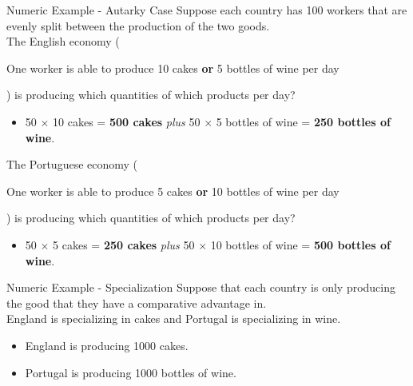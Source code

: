 \documentclass{beamer}
\begin{document}
\begin{frame}{Numeric Example - Autarky Case}
    Suppose each country has 100 workers that are evenly split between the production of the two goods. \vspace{0.1cm} \\
    The English economy (\begin{small}One worker is able to produce 10 cakes \textbf{or} 5 bottles of wine per day\end{small}) is producing which quantities of which products per day? \pause 
    \begin{itemize} \small
        \item 50 $\times$ 10 cakes = \textbf{500 cakes} \textit{plus} 50 $\times$ 5 bottles of wine = \textbf{250 bottles of wine}. \pause
    \end{itemize}
    The Portuguese economy (\begin{small}One worker is able to produce 5 cakes \textbf{or} 10 bottles of wine per day\end{small}) is producing which quantities of which products per day? \pause 
    \begin{itemize} \small
        \item 50 $\times$ 5 cakes = \textbf{250 cakes} \textit{plus} 50 $\times$ 10 bottles of wine = \textbf{500 bottles of wine}. 
    \end{itemize}
\end{frame}

\begin{frame}{Numeric Example - Specialization}
    Suppose that each country is only producing the good that they have a comparative advantage in. \vspace{0.1cm} \\
    England is specializing in cakes and Portugal is specializing in wine. 
    \begin{itemize}
        \item England is producing 1000 cakes.
        \item Portugal is producing 1000 bottles of wine. 
    \end{itemize}
\end{frame}
\end{document}
